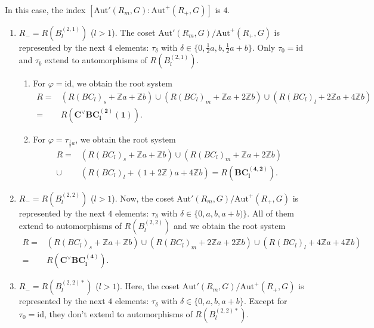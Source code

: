 \documentclass[11pt]{amsart}
\newcommand{\Z}{\mathbb{Z}}
\newcommand{\Aut}{\mathrm{Aut}}
\newcommand{\id}{\mathrm{id}}
\begin{document}
\medskip


 \quad \\

In this case, the index $[\Aut'(R_m,G):\Aut^+(R_+,G)]$ is $4$.   

\begin{enumerate}
\item[(I)] $R_-=R(B_l^{(2,1)})$\; ($l>1$). The coset $\Aut'(R_m,G)/\Aut^+(R_+,G)$ is represented by the next $4$ elements: $\tau_\delta$ with $\delta \in \{0, \frac{1}{2}a, b, \frac{1}{2}a+b\}$. Only $\tau_0=\id$ and $\tau_b$ extend to automorphisms of $R(B_l^{(2,1)})$.
\begin{enumerate}
\item[(i)] For $\varphi=\id$, we obtain the root system
\begin{align*}
 R=
 &(R(BC_l)_s+\Z a+\Z b) \cup (R(BC_l)_m+\Z a+2\Z b) \cup (R(BC_l)_l+2\Z a+4\Z b) \\
 =
 &R(\mathbf{C^\vee BC_l^{(2)}(1)}).
\end{align*}
\item[(ii)] For $\varphi=\tau_{\frac{1}{2}a}$, we obtain the root system
\begin{align*}
R=
&(R(BC_l)_s+\Z a+\Z b) \cup (R(BC_l)_m+\Z a+2\Z b)  \\
\cup
&(R(BC_l)_l+(1+2\Z) a+4\Z b)= R(\mathbf{BC_l^{(4,2)}}).
\end{align*}
\end{enumerate}
\item[(II)] $R_-=R(B_l^{(2,2)})$\; ($l>1$). Now, the coset $\Aut'(R_m,G)/\Aut^+(R_+,G)$ is represented by the next $4$ elements: $\tau_\delta$ with $\delta \in \{0, a, b, a+b)\}$. All of them extend to automorphisms of $R(B_l^{(2,2)})$ and we obtain the root system
\begin{align*}
R=
&(R(BC_l)_s+\Z a+\Z b) \cup (R(BC_l)_m+2\Z a+2\Z b) \cup (R(BC_l)_l+4\Z a+4\Z b) \\
=
& R(\mathbf{C^\vee BC_l^{(4)}}).
\end{align*}
\item[(III)] $R_-=R(B_l^{(2,2)\ast})$\; ($l>1$). Here, the coset $\Aut'(R_m,G)/\Aut^+(R_+,G)$ is represented by the next $4$ elements: $\tau_\delta$ with $\delta \in \{0, a, b, a+b\}$. Except for $\tau_0=\id$, they don't extend to automorphisms of $R(B_l^{(2,2)\ast})$.

\end{enumerate}
\end{document}
